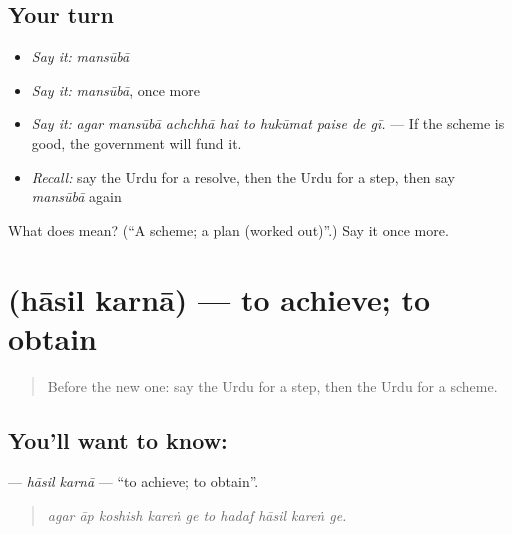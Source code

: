 \subsection*{Your turn}
\begin{itemize}
\raggedright
  \item \emph{Say it:} \emph{mansūbā}
  \item \emph{Say it:} \emph{mansūbā}, once more
  \item \emph{Say it:} \emph{agar mansūbā achchhā hai to hukūmat paise de gī.} — If the scheme is good, the government will fund it.
  \item \emph{Recall:} say the Urdu for a resolve, then the Urdu for a step, then say \emph{mansūbā} again
\end{itemize}

\begin{tcolorbox}[breakable,colback=teal!4,colframe=teal!35!black,title={Before you move on}]
What does  mean? (\textquotedblleft{}A scheme; a plan (worked out)\textquotedblright{}.) Say it once more.
\end{tcolorbox}
\section[\texorpdfstring{\ur{حاصل} \ur{کرنا} (hāsil karnā)}{حاصل کرنا (hāsil karnā)}]{  (hāsil karnā) — to achieve; to obtain}

\label{lesson:UR-C378-hasil-karna}



\begin{quote}
Before the new one: say the Urdu for a step, then the Urdu for a scheme.
\end{quote}

\subsection*{You'll want to know:  }
\textbf{ } — \emph{hāsil karnā} — \textquotedblleft{}to achieve; to obtain\textquotedblright{}.

\begin{quote}
         
\end{quote}

\begin{quote}
\emph{agar āp koshish kareṅ ge to hadaf hāsil kareṅ ge.}
\end{quote}

